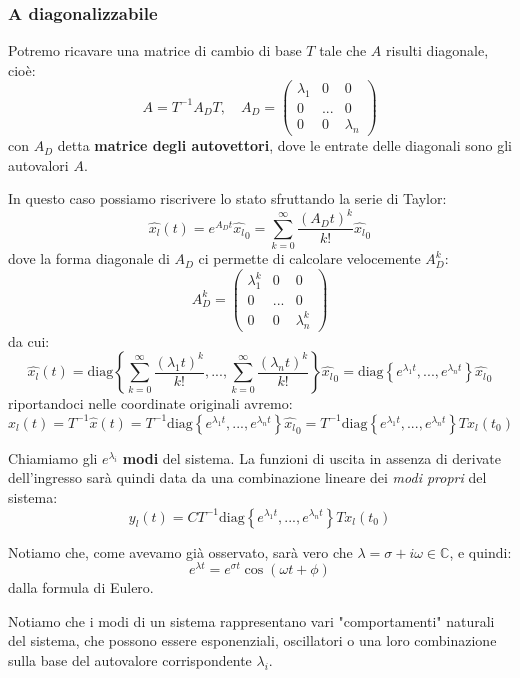 \documentclass[a4paper,11pt]{article}
\begin{document}
\subsubsection{A diagonalizzabile}
Potremo ricavare una matrice di cambio di base $T$ tale che $A$ risulti diagonale, cioè:
$$
A = T^{-1} A_D T, \quad A_D = \begin{pmatrix}
	\lambda_1 & 0 & 0 \\
	0 & ... & 0 \\
	0 & 0 & \lambda_n
\end{pmatrix}
$$
con $A_D$ detta \textbf{matrice degli autovettori}, dove le entrate delle diagonali sono gli autovalori $A$.

In questo caso possiamo riscrivere lo stato sfruttando la serie di Taylor:
$$
\hat{x_l}(t) = e^{A_Dt} \hat{x_l}_0 = \sum_{k = 0}^\infty \frac{(A_D t)^k}{k!}\hat{x_l}_0
$$
dove la forma diagonale di $A_D$ ci permette di calcolare velocemente $A_D^k$:
$$
A_D^k = \begin{pmatrix}
	\lambda_1^k & 0 & 0 \\
	0 & ... & 0 \\
	0 & 0 & \lambda_n^k
\end{pmatrix}
$$
da cui:
$$
\hat{x_l}(t) = \mathrm{diag} \left\{ \sum_{k = 0}^\infty \frac{(\lambda_1 t)^k}{k!}, ... , \sum_{k = 0}^\infty \frac{(\lambda_n t)^k}{k!} \right\} \hat{x_l}_0
= \mathrm{diag} \left\{ e^{\lambda_1 t}, ..., e^{\lambda_n t} \right\} \hat{x_l}_0
$$
riportandoci nelle coordinate originali avremo:
$$
x_l(t) = T^{-1} \hat{x}(t) = T^{-1} \mathrm{diag} \left\{ e^{\lambda_1 t}, ..., e^{\lambda_n t} \right\} \hat{x_l}_0 = T^{-1} \mathrm{diag} \left\{ e^{\lambda_1 t}, ..., e^{\lambda_n t} \right\} T x_l(t_0)
$$

Chiamiamo gli $e^{\lambda_i}$ \textbf{modi} del sistema.
La funzioni di uscita in assenza di derivate dell'ingresso sarà quindi data da una combinazione lineare dei \textit{modi propri} del sistema:
$$
y_l(t) = C T^{-1} \mathrm{diag} \left\{ e^{\lambda_1 t}, ..., e^{\lambda_n t} \right\} T x_l(t_0)
$$

Notiamo che, come avevamo già osservato, sarà vero che $\lambda = \sigma + i \omega \in \mathbb{C}$, e quindi:
$$
e^{\lambda t} = e^{\sigma t} \cos(\omega t + \phi)
$$
dalla formula di Eulero.

\par\smallskip

Notiamo che i modi di un sistema rappresentano vari "comportamenti" naturali del sistema, che possono essere esponenziali, oscillatori o una loro combinazione sulla base del autovalore corrispondente $\lambda_i$.
\end{document}
